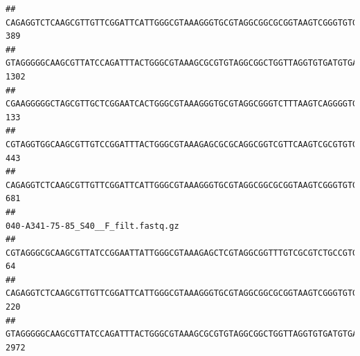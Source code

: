 \documentclass[]{article}
\begin{document}
\begin{verbatim}
## CAGAGGTCTCAAGCGTTGTTCGGATTCATTGGGCGTAAAGGGTGCGTAGGCGGCGCGGTAAGTCGGGTGTGAAATCTCGGAGCTTAACTCCGAAACTGCATTCGATACTGCCGTGCTTGAGGACTGGAGAGGAGACTGGAATTTACGGTGTAGCGGTGAAATGCGTAGATATCGTAAGGAAGACCAGTGGCGAAGGCGGGTCTCTGGACAGTTCCTGACGCTGAGGCACGAAGGCCAGGGGAGCAAACG                                 389
## GTAGGGGGCAAGCGTTATCCAGATTTACTGGGCGTAAAGCGCGTGTAGGCGGCTGGTTAGGTGTGATGTGAAATCTTCCGGCTCAACCGGAAAACTGCATTGCAAACCGGCCTGGCTAGAGTGCAGGAGAGGGAAGCGGAATTCCAGGTGTAGCGGTGAAATGCGTAGATATCTGGAGGAACACCAGTGGCGAAGGCGGCTTCCTGGCCTGCAACTGACGCTGAGACGCGAAAGCGTGGGGAGCGAAC                                 1302
## CGAAGGGGGCTAGCGTTGCTCGGAATCACTGGGCGTAAAGGGTGCGTAGGCGGGTCTTTAAGTCAGGGGTGAAATCCTGGAGCTCAACTCCAGAACTGCCTTTGATACTGAAGATCTTGAGTTCGGGAGAGGTGAGTGGAACTGCGAGTGTAGAGGTGAAATTCGTAGATATTCGCAAGAACACCAGTGGCGAAGGCGGCTCACTGGCCCGATACTGACGCTGAGGCACGAAAGCGTGGGGAGCAAACA                                 133
## CGTAGGTGGCAAGCGTTGTCCGGATTTACTGGGCGTAAAGAGCGCGCAGGCGGTCGTTCAAGTCGCGTGTGAAAGCCCCCGGCTCAACTGGGGAGGGTCACGCGATACTGATCGACTCGAAGGCAGGAGAGGGTAGTGGAATTCCCGGTGTAGTGGTGAAATGCGTAGATATCGGGAGGAACACCAGTGGCGAAGGCGACTACCTGGCCTGTTCTTGACGCTGAGGCGCGAAAGCTAGGGGAGCAAACG                                 443
## CAGAGGTCTCAAGCGTTGTTCGGATTCATTGGGCGTAAAGGGTGCGTAGGCGGCGCGGTAAGTCGGGTGTGAAATCTCGGGGCTTAACTCCGAAACTGCATTCGATACTGCCGTGCTTGAGGACTGGAGAGGAGACTGGAATTTACGGTGTAGCGGTGAAATGCGTAGATATCGTAAGGAAGACCAGTGGCGAAGGCGGGTCTCTGGACAGTTCCTGACGCTGAGGCACGAAGGCCAGGGGAGCAAACG                                 681
##                                                                                                                                                                                                                                                           040-A341-75-85_S40__F_filt.fastq.gz
## CGTAGGGCGCAAGCGTTATCCGGAATTATTGGGCGTAAAGAGCTCGTAGGCGGTTTGTCGCGTCTGCCGTGAAAGTCCGGGGCTCAACTCCGGATCTGCGGTGGGTACGGGCAGACTAGAGTGATGTAGGGGAGACTGGAATTCCTGGTGTAGCGGTGAAATGCGCAGATATCAGGAGGAACACCGATGGCGAAGGCAGGTCTCTGGGCATTAACTGACGCTGAGGAGCGAAAGCATGGGGAGCGAACA                                  64
## CAGAGGTCTCAAGCGTTGTTCGGATTCATTGGGCGTAAAGGGTGCGTAGGCGGCGCGGTAAGTCGGGTGTGAAATCTCGGAGCTTAACTCCGAAACTGCATTCGATACTGCCGTGCTTGAGGACTGGAGAGGAGACTGGAATTTACGGTGTAGCGGTGAAATGCGTAGATATCGTAAGGAAGACCAGTGGCGAAGGCGGGTCTCTGGACAGTTCCTGACGCTGAGGCACGAAGGCCAGGGGAGCAAACG                                 220
## GTAGGGGGCAAGCGTTATCCAGATTTACTGGGCGTAAAGCGCGTGTAGGCGGCTGGTTAGGTGTGATGTGAAATCTTCCGGCTCAACCGGAAAACTGCATTGCAAACCGGCCTGGCTAGAGTGCAGGAGAGGGAAGCGGAATTCCAGGTGTAGCGGTGAAATGCGTAGATATCTGGAGGAACACCAGTGGCGAAGGCGGCTTCCTGGCCTGCAACTGACGCTGAGACGCGAAAGCGTGGGGAGCGAAC                                 2972

\end{verbatim}
\end{document}
